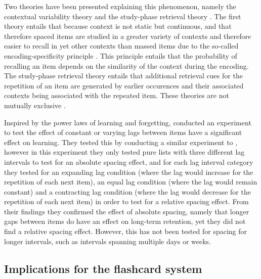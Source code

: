 Two theories have been presented explaining this phenomenon, namely the contextual variability theory and the study-phase retrieval theory \cite{siegel}. The first theory entails that because context is not static but continuous, and that therefore spaced items are studied in a greater variety of contexts and therefore easier to recall in yet other contexts than massed items due to the so-called encoding-specificity principle \cite{cognitivepsychology}. This principle entails that the probability of recalling an item depends on the similarity of the context during the encoding. The study-phase retrieval theory entails that additional retrieval cues for the repetition of an item are generated by earlier occurences and their associated contexts being associated with the repeated item. These theories are not mutually exclusive \cite{siegel}.

Inspired by the power laws of learning and forgetting,  conducted an experiment to test the effect of constant or varying lags between items have a significant effect on learning. They tested this by conducting a similar experiment to , however in this experiment they only tested pure lists with three different lag intervals to test for an absolute spacing effect, and for each lag interval category they tested for an expanding lag condition (where the lag would increase for the repetition of each next item), an equal lag condition (where the lag would remain constant) and a contracting lag condition (where the lag would decrease for the repetition of each next item) in order to test for a relative spacing effect. From their findings they confirmed the effect of absolute spacing, namely that longer gaps between items do have an effect on long-term retention, yet they did not find a relative spacing effect. However, this has not been tested for spacing for longer intervals, such as intervals spanning multiple days or weeks.

\subsection{Implications for the flashcard system}

